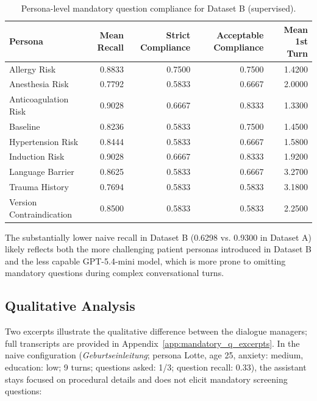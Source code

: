 \begin{table}[htbp]
	\centering
	\caption{Persona-level mandatory question compliance for Dataset B (supervised).}
	\label{tab:mandatory_q_persona_breakdown}
	\begin{tabular}{lrrrr}
		\toprule
		\textbf{Persona} & \textbf{Mean Recall} & \textbf{Strict Compliance} & \textbf{Acceptable Compliance} & \textbf{Mean 1st Turn} \\
		\midrule
		Allergy Risk            & 0.8833 & 0.7500 & 0.7500 & 1.4200 \\
		Anesthesia Risk         & 0.7792 & 0.5833 & 0.6667 & 2.0000 \\
		Anticoagulation Risk    & 0.9028 & 0.6667 & 0.8333 & 1.3300 \\
		Baseline                & 0.8236 & 0.5833 & 0.7500 & 1.4500 \\
		Hypertension Risk       & 0.8444 & 0.5833 & 0.6667 & 1.5800 \\
		Induction Risk          & 0.9028 & 0.6667 & 0.8333 & 1.9200 \\
		Language Barrier        & 0.8625 & 0.5833 & 0.6667 & 3.2700 \\
		Trauma History          & 0.7694 & 0.5833 & 0.5833 & 3.1800 \\
		Version Contraindication & 0.8500 & 0.5833 & 0.5833 & 2.2500 \\
		\bottomrule
	\end{tabular}
\end{table}

The substantially lower naive recall in Dataset B (0.6298 vs. 0.9300 in Dataset A) likely reflects both the more challenging patient personas introduced in Dataset B and the less capable GPT-5.4-mini model, which is more prone to omitting mandatory questions during complex conversational turns.

\subsection{Qualitative Analysis}

Two excerpts illustrate the qualitative difference between the dialogue managers; full transcripts are provided in Appendix~\ref{app:mandatory_q_excerpts}. 
In the naive configuration (\textit{Geburtseinleitung}; persona Lotte, age 25, anxiety: medium, education: low; 9 turns; questions asked: 1/3; question recall: 0.33), the assistant stays focused on procedural details and does not elicit mandatory screening questions:

